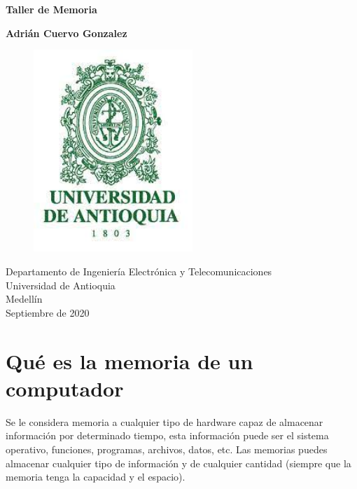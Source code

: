 \documentclass{article}
\begin{document}
	
	\begin{titlepage}
		\begin{center}
			\vspace*{1cm}
			
			\Huge
			\textbf{Taller de Memoria}
			
			\vspace{0.5cm}
			\LARGE
			
			\vspace{1.5cm}
			
			\textbf{Adrián Cuervo Gonzalez}
			\vfill
			\begin{figure}[h]
				\includegraphics[width=6cm]{Images/EscudoUdeA.jpg}
				\centering
				\label{fig:EscudoUdeA}
			\end{figure}
			
			\vspace{0.8cm}
			
			\LARGE
			Departamento de Ingeniería Electrónica y Telecomunicaciones\\
			Universidad de Antioquia\\
			Medellín\\
			Septiembre de 2020
			
		\end{center}
	\end{titlepage}
	
	\tableofcontents
	\newpage
	\section{Qué es la memoria de un computador}\label{intro}
	Se le considera memoria a cualquier tipo de hardware capaz de almacenar información por determinado tiempo, esta información puede ser el sistema operativo, funciones, programas, archivos, datos, etc. Las memorias puedes almacenar cualquier tipo de información y de cualquier cantidad (siempre que la memoria tenga la capacidad y el espacio).
	
\end{document}

